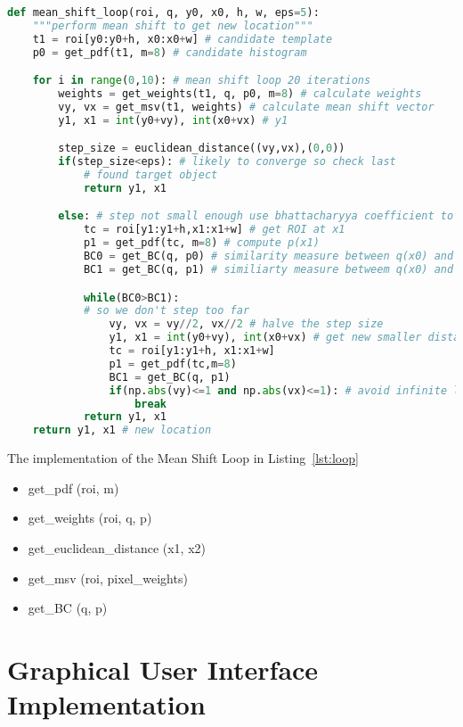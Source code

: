 \begin{lstlisting}[language=Python, caption={Mean Shift Loop}, captionpos=b, label={lst:loop}]
def mean_shift_loop(roi, q, y0, x0, h, w, eps=5):
    """perform mean shift to get new location"""
    t1 = roi[y0:y0+h, x0:x0+w] # candidate template
    p0 = get_pdf(t1, m=8) # candidate histogram

    for i in range(0,10): # mean shift loop 20 iterations
        weights = get_weights(t1, q, p0, m=8) # calculate weights
        vy, vx = get_msv(t1, weights) # calculate mean shift vector
        y1, x1 = int(y0+vy), int(x0+vx) # y1

        step_size = euclidean_distance((vy,vx),(0,0))
        if(step_size<eps): # likely to converge so check last
            # found target object
            return y1, x1

        else: # step not small enough use bhattacharyya coefficient to refine step
            tc = roi[y1:y1+h,x1:x1+w] # get ROI at x1
            p1 = get_pdf(tc, m=8) # compute p(x1)
            BC0 = get_BC(q, p0) # similarity measure between q(x0) and p(x0) 
            BC1 = get_BC(q, p1) # similiarty measure betweem q(x0) and p(x1)

            while(BC0>BC1):
            # so we don't step too far
                vy, vx = vy//2, vx//2 # halve the step size
                y1, x1 = int(y0+vy), int(x0+vx) # get new smaller distance 
                tc = roi[y1:y1+h, x1:x1+w]
                p1 = get_pdf(tc,m=8)
                BC1 = get_BC(q, p1)
                if(np.abs(vy)<=1 and np.abs(vx)<=1): # avoid infinite loop
                    break
            return y1, x1
    return y1, x1 # new location
\end{lstlisting}

The implementation of the Mean Shift Loop in Listing~\ref{lst:loop} 
\begin{itemize}
    \item get\_pdf (roi, m)
    \item get\_weights (roi, q, p)
    \item get\_euclidean\_distance (x1, x2)
    \item get\_msv (roi, pixel\_weights)
    \item get\_BC (q, p)
\end{itemize}


\section{Graphical User Interface Implementation}
